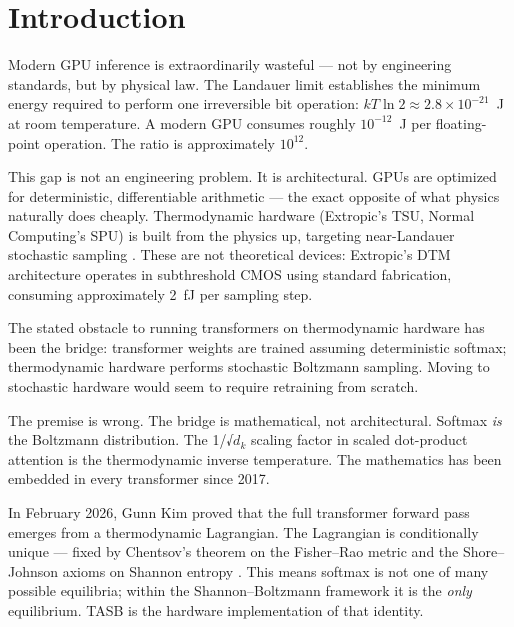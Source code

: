 \documentclass[11pt,a4paper]{article}
\begin{document}
\section{Introduction}
\label{sec:intro}

Modern GPU inference is extraordinarily wasteful --- not by engineering
standards, but by physical law. The Landauer limit \citep{landauer1961irreversibility}
establishes the minimum energy required to perform one irreversible bit
operation: $kT \ln 2 \approx 2.8 \times 10^{-21}$~J at room temperature.
A modern GPU consumes roughly $10^{-12}$~J per floating-point operation.
The ratio is approximately $10^{12}$.

This gap is not an engineering problem. It is architectural. GPUs are optimized
for deterministic, differentiable arithmetic --- the exact opposite of what
physics naturally does cheaply. Thermodynamic hardware (Extropic's TSU,
Normal Computing's SPU) is built from the physics up, targeting near-Landauer
stochastic sampling \citep{extropic_tsu101}. These are not theoretical devices:
Extropic's DTM architecture operates in subthreshold CMOS using standard
fabrication, consuming approximately 2~fJ per sampling step.

The stated obstacle to running transformers on thermodynamic hardware has been
the bridge: transformer weights are trained assuming deterministic softmax;
thermodynamic hardware performs stochastic Boltzmann sampling. Moving to
stochastic hardware would seem to require retraining from scratch.

The premise is wrong. The bridge is mathematical, not architectural. Softmax
\emph{is} the Boltzmann distribution. The 1/√$d_k$ scaling factor in scaled
dot-product attention \citep{vaswani2017attention} is the thermodynamic inverse
temperature. The mathematics has been embedded in every transformer since 2017.

In February 2026, Gunn Kim \citep{kim2026thermodynamic} proved that the full
transformer forward pass emerges from a thermodynamic Lagrangian. The
Lagrangian is conditionally unique --- fixed by Chentsov's theorem on the
Fisher--Rao metric and the Shore--Johnson axioms on Shannon entropy
\citep{shore1980axiomatic, chentsov1982statistical}. This means softmax is
not one of many possible equilibria; within the Shannon--Boltzmann framework
it is the \emph{only} equilibrium. TASB is the hardware implementation of
that identity.
\end{document}

